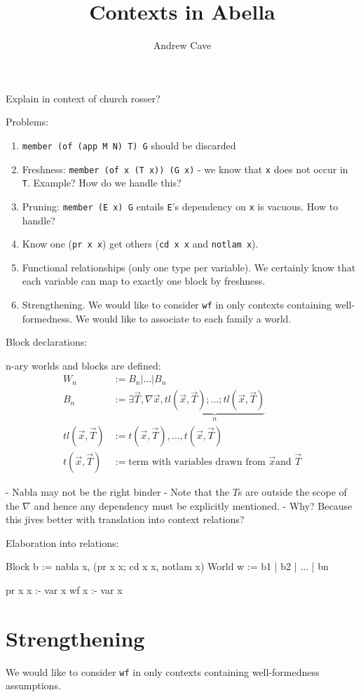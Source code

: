 \documentclass{article}
\title{Contexts in Abella}
\author{Andrew Cave}
\begin{document}
\maketitle
Explain in context of church rosser?

Problems:
\begin{enumerate}
\item {\tt member (of (app M N) T) G} should be discarded
\item Freshness: {\tt member (of x (T x)) (G x)} - we know that  {\tt x}
  does not occur in {\tt T}. Example? How do we handle this? 
\item Pruning: {\tt member (E x) G} entails {\tt E}'s dependency on
  {\tt x} is vacuous. How to handle?
\item Know one ({\tt pr x x}) get others ({\tt cd x x} and {\tt notlam x}).
\item Functional relationships (only one type per variable). We
  certainly know that each variable can map to exactly one block by
  freshness.
\item Strengthening. We would like to consider {\tt wf} in only
  contexts containing well-formedness. We would like to associate to
  each family a world.
\end{enumerate}

Block declarations:

n-ary worlds and blocks are defined: 
\begin{align*}
W_n &:= B_n | ... | B_n \\
B_n &:= \exists \vec{T}, \nabla \vec{x}, \underbrace{tl(\vec{x}, \vec{T}); ...;
tl(\vec{x}, \vec{T})}_{n} \\
tl(\vec{x}, \vec{T}) &:= t(\vec{x}, \vec{T}), ..., t(\vec{x}, \vec{T}) \\
t(\vec{x}, \vec{T}) &:= \text{term with variables drawn from } \vec{x} \text{
  and } \vec{T}
\end{align*}

- Nabla may not be the right binder
- Note that the $T$s are outside the scope of the $\nabla$ and hence
any dependency must be explicitly mentioned.
- Why? Because this jives better with translation into context
relations? 

Elaboration into relations:

Block b := nabla x, (pr x x; cd x x, notlam x)
World w := b1 | b2 | ... | bn

pr x x :- var x
wf x :- var x

\section{Strengthening}
We would like to consider {\tt wf} in only
contexts containing well-formedness assumptions.
\end{document}

